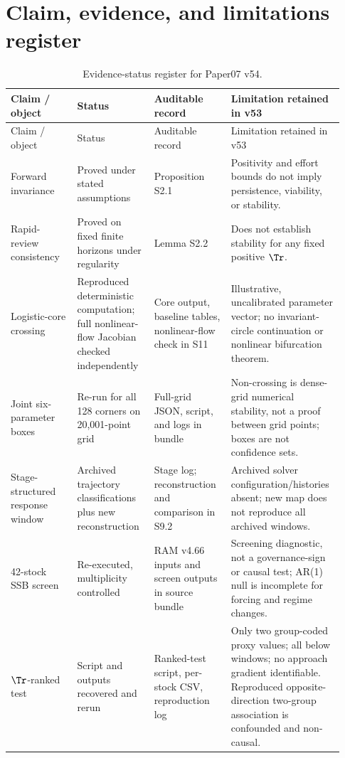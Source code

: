 \section{Claim, evidence, and limitations register}\label{si:status}

\begin{longtable}{@{}p{0.19\linewidth}p{0.22\linewidth}p{0.22\linewidth}p{0.30\linewidth}@{}}
\caption{Evidence-status register for Paper07 v54.}\label{tab:status}\\
\toprule
Claim / object & Status & Auditable record & Limitation retained in v53 \\
\midrule
\endfirsthead
\toprule
Claim / object & Status & Auditable record & Limitation retained in v53 \\
\midrule
\endhead
\bottomrule
\endlastfoot
Forward invariance & Proved under stated assumptions & Proposition S2.1 & Positivity and effort bounds do not imply persistence, viability, or stability. \\
Rapid-review consistency & Proved on fixed finite horizons under regularity & Lemma S2.2 & Does not establish stability for any fixed positive \(\Tr\). \\
Logistic-core crossing & Reproduced deterministic computation; full nonlinear-flow Jacobian checked independently & Core output, baseline tables, nonlinear-flow check in S11 & Illustrative, uncalibrated parameter vector; no invariant-circle continuation or nonlinear bifurcation theorem. \\
Joint six-parameter boxes & Re-run for all 128 corners on 20,001-point grid & Full-grid JSON, script, and logs in bundle & Non-crossing is dense-grid numerical stability, not a proof between grid points; boxes are not confidence sets. \\
Stage-structured response window & Archived trajectory classifications plus new reconstruction & Stage log; reconstruction and comparison in S9.2 & Archived solver configuration/histories absent; new map does not reproduce all archived windows. \\
42-stock SSB screen & Re-executed, multiplicity controlled & RAM v4.66 inputs and screen outputs in source bundle & Screening diagnostic, not a governance-sign or causal test; AR(1) null is incomplete for forcing and regime changes. \\
\(\Tr\)-ranked test & Script and outputs recovered and rerun & Ranked-test script, per-stock CSV, reproduction log & Only two group-coded proxy values; all below windows; no approach gradient identifiable. Reproduced opposite-direction two-group association is confounded and non-causal. \\

\end{longtable}
